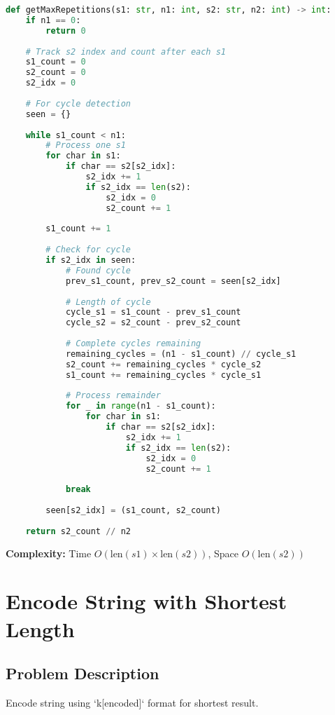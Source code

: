 \documentclass[10pt, a4paper]{article}
\begin{document}
\begin{lstlisting}[language=Python]
def getMaxRepetitions(s1: str, n1: int, s2: str, n2: int) -> int:
    if n1 == 0:
        return 0
    
    # Track s2 index and count after each s1
    s1_count = 0
    s2_count = 0
    s2_idx = 0
    
    # For cycle detection
    seen = {}
    
    while s1_count < n1:
        # Process one s1
        for char in s1:
            if char == s2[s2_idx]:
                s2_idx += 1
                if s2_idx == len(s2):
                    s2_idx = 0
                    s2_count += 1
        
        s1_count += 1
        
        # Check for cycle
        if s2_idx in seen:
            # Found cycle
            prev_s1_count, prev_s2_count = seen[s2_idx]
            
            # Length of cycle
            cycle_s1 = s1_count - prev_s1_count
            cycle_s2 = s2_count - prev_s2_count
            
            # Complete cycles remaining
            remaining_cycles = (n1 - s1_count) // cycle_s1
            s2_count += remaining_cycles * cycle_s2
            s1_count += remaining_cycles * cycle_s1
            
            # Process remainder
            for _ in range(n1 - s1_count):
                for char in s1:
                    if char == s2[s2_idx]:
                        s2_idx += 1
                        if s2_idx == len(s2):
                            s2_idx = 0
                            s2_count += 1
            
            break
        
        seen[s2_idx] = (s1_count, s2_count)
    
    return s2_count // n2
\end{lstlisting}
\textbf{Complexity:} Time $O(\text{len}(s1) \times \text{len}(s2))$, Space $O(\text{len}(s2))$

\section{Encode String with Shortest Length}
\subsection*{Problem Description}
Encode string using `k[encoded]` format for shortest result.
\end{document}
